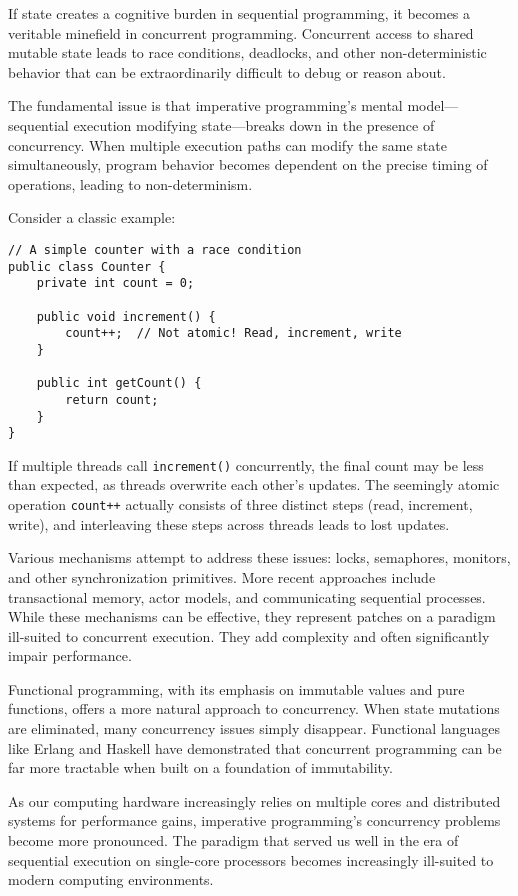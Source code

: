\documentclass[11pt]{article}
\begin{document}
If state creates a cognitive burden in sequential programming, it becomes a veritable minefield in concurrent programming. Concurrent access to shared mutable state leads to race conditions, deadlocks, and other non-deterministic behavior that can be extraordinarily difficult to debug or reason about.

The fundamental issue is that imperative programming's mental model—sequential execution modifying state—breaks down in the presence of concurrency. When multiple execution paths can modify the same state simultaneously, program behavior becomes dependent on the precise timing of operations, leading to non-determinism.

Consider a classic example:

\begin{verbatim}
// A simple counter with a race condition
public class Counter {
    private int count = 0;

    public void increment() {
        count++;  // Not atomic! Read, increment, write
    }

    public int getCount() {
        return count;
    }
}
\end{verbatim}

If multiple threads call \texttt{increment()} concurrently, the final count may be less than expected, as threads overwrite each other's updates. The seemingly atomic operation \texttt{count++} actually consists of three distinct steps (read, increment, write), and interleaving these steps across threads leads to lost updates.

Various mechanisms attempt to address these issues: locks, semaphores, monitors, and other synchronization primitives. More recent approaches include transactional memory, actor models, and communicating sequential processes. While these mechanisms can be effective, they represent patches on a paradigm ill-suited to concurrent execution. They add complexity and often significantly impair performance.

Functional programming, with its emphasis on immutable values and pure functions, offers a more natural approach to concurrency. When state mutations are eliminated, many concurrency issues simply disappear. Functional languages like Erlang and Haskell have demonstrated that concurrent programming can be far more tractable when built on a foundation of immutability.

As our computing hardware increasingly relies on multiple cores and distributed systems for performance gains, imperative programming's concurrency problems become more pronounced. The paradigm that served us well in the era of sequential execution on single-core processors becomes increasingly ill-suited to modern computing environments.
\end{document}
